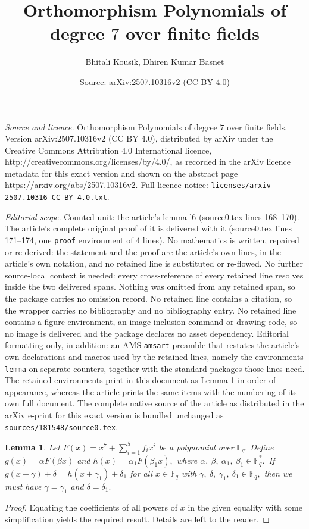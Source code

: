 \documentclass[10pt,a4paper]{amsart}
\title{Orthomorphism Polynomials of degree $7$ over finite fields}
\author{Bhitali Kousik, Dhiren Kumar Basnet}
\date{Source: arXiv:2507.10316v2 (CC BY 4.0)}
\newtheorem{lemma}{Lemma}
\begin{document}
\maketitle

\noindent\emph{Source and licence.} Orthomorphism Polynomials of degree $7$ over finite fields. Version arXiv:2507.10316v2 (CC BY 4.0), distributed by arXiv under the Creative Commons Attribution 4.0 International licence, http://creativecommons.org/licenses/by/4.0/, as recorded in the arXiv licence metadata for this exact version and shown on the abstract page https://arxiv.org/abs/2507.10316v2. Full licence notice: \texttt{licenses/arxiv-2507.10316-CC-BY-4.0.txt}.\par\smallskip

\noindent\textit{Editorial scope.} Counted unit: the article's lemma l6 (source0.tex lines 168--170). The article's complete original proof of it is delivered with it (source0.tex lines 171--174, one \texttt{proof} environment of 4 lines). No mathematics is written, repaired or re-derived: the statement and the proof are the article's own lines, in the article's own notation, and no retained line is substituted or re-flowed.  No further source-local context is needed: every cross-reference of every retained line resolves inside the two delivered spans.  Nothing was omitted from any retained span, so the package carries no omission record.  No retained line contains a citation, so the wrapper carries no bibliography and no bibliography entry.  No retained line contains a figure environment, an image-inclusion command or drawing code, so no image is delivered and the package declares no asset dependency.  Editorial formatting only, in addition: an AMS \texttt{amsart} preamble that restates the article's own declarations and macros used by the retained lines, namely the environments \texttt{lemma} on separate counters, together with the standard packages those lines need.  The retained environments print in this document as Lemma 1 in order of appearance, whereas the article prints the same items with the numbering of its own full document.  The complete native source of the article as distributed in the arXiv e-print for this exact version is bundled unchanged as \texttt{sources/181548/source0.tex}.
\begin{lemma}\label{l6}
    Let $F(x)= x^7+\sum_{i=1}^{5}f_ix^i$ be a polynomial over $\mathbb{F}_q.$ Define $g(x)=\alpha F(\beta x)$ and $h(x)=\alpha_1 F(\beta_1 x),$ where $\alpha,~\beta,~\alpha_1,~\beta_1 \in \mathbb{F}_q^*.$~If $g( x+\gamma)+\delta= h(x+\gamma_1)+\delta_1$ for all $x\in \mathbb{F}_q$ with $\gamma,~\delta,~\gamma_1,~\delta_1 \in \mathbb{F}_q,$ then we must have $\gamma=\gamma_1$ and $\delta=\delta_1.$ 
\end{lemma}

\begin{proof}
Equating the coefficients of all powers of $x$ in the given equality with some simplification yields the required result. Details are left to the reader.

\end{proof}
\end{document}
